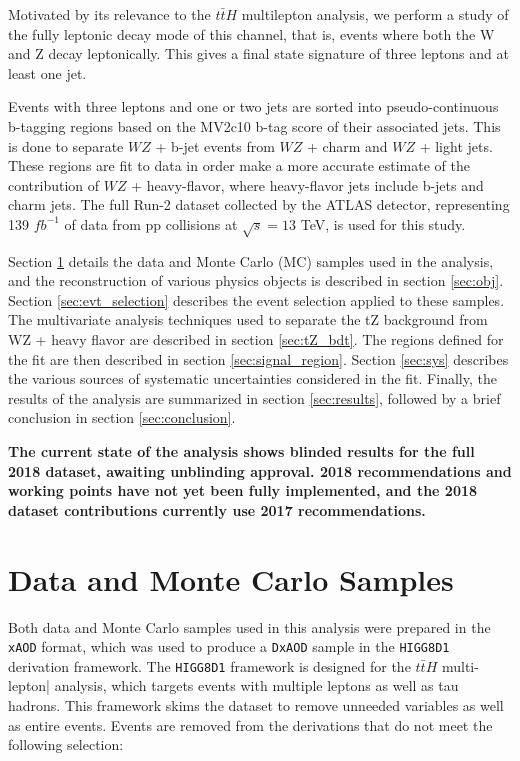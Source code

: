 \documentclass[NOTE, atlasdraft=true, texlive=2016, UKenglish]{\ATLASLATEXPATH atlasdoc}
\begin{document}
Motivated by its relevance to the $t\bar{t}H$ multilepton analysis, we perform a study of the fully leptonic decay mode of this channel, that is, events where both the W and Z decay leptonically. This gives a final state signature of three leptons and at least one jet.

Events with three leptons and one or two jets are sorted into pseudo-continuous b-tagging regions based on the MV2c10 b-tag score of their associated jets. This is done to separate $WZ$ + b-jet events from $WZ$ + charm and $WZ$ + light jets. These regions are fit to data in order make a more accurate estimate of the contribution of $WZ$ + heavy-flavor, where heavy-flavor jets include b-jets and charm jets. The full Run-2 dataset collected by the ATLAS detector, representing 139 $fb^{-1}$ of data from pp collisions at $\sqrt{s} = 13$ TeV, is used for this study.

Section \ref{sec:data} details the data and Monte Carlo (MC) samples used in the analysis, and the reconstruction of various physics objects is described in section \ref{sec:obj}. Section \ref{sec:evt_selection} describes the event selection applied to these samples. The multivariate analysis techniques used to separate the tZ background from WZ + heavy flavor are described in section \ref{sec:tZ_bdt}. The regions defined for the fit are then described in section \ref{sec:signal_region}. Section \ref{sec:sys} describes the various sources of systematic uncertainties considered in the fit. Finally, the results of the analysis are summarized in section \ref{sec:results}, followed by a brief conclusion in section \ref{sec:conclusion}.

\textbf{The current state of the analysis shows blinded results for the full 2018 dataset, awaiting unblinding approval. 2018 recommendations and working points have not yet been fully implemented, and the 2018 dataset contributions currently use 2017 recommendations.}

\section{Data and Monte Carlo Samples}
\label{sec:data}

Both data and Monte Carlo samples used in this analysis were prepared in the \verb|xAOD| format, which was used to produce a \verb|DxAOD| sample in the \verb|HIGG8D1| derivation framework. The \verb|HIGG8D1| framework is designed for the $t\bar{t}H$ multi-lepton| analysis, which targets events with multiple leptons as well as tau hadrons. This framework skims the dataset to remove unneeded variables as well as entire events. Events are removed from the derivations that do not meet the following selection:
\end{document}
